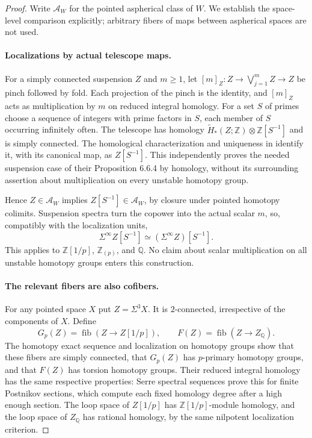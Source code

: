 \begin{proof}
Write $\mathcal A_W$ for the pointed aspherical class of $W$.
We establish the space-level comparison explicitly; arbitrary fibers
of maps between aspherical spaces are not used.

\paragraph{Localizations by actual telescope maps.}
For a simply connected suspension $Z$ and $m\geq1$, let
$[m]_Z:Z\to\bigvee_{j=1}^m Z\to Z$ be pinch followed by fold.
Each projection of the pinch is the identity, and $[m]_Z$ acts
as multiplication by $m$ on reduced integral homology.
For a set $S$ of primes choose a sequence of integers with prime
factors in $S$, each member of $S$ occurring infinitely often.
The telescope has homology
$\widetilde H_*(Z;\mathbb Z)\otimes\mathbb Z[S^{-1}]$ and is
simply connected.  The homological characterization and uniqueness
in \citet[Theorems 6.1.1--6.1.2]{A3MayPonto2012} identify it,
with its canonical map, as $Z[S^{-1}]$.
This independently proves the needed suspension case of their
Proposition 6.6.4 by homology, without its surrounding assertion
about multiplication on every unstable homotopy group.

Hence $Z\in\mathcal A_W$ implies
$Z[S^{-1}]\in\mathcal A_W$, by closure under pointed homotopy
colimits.  Suspension spectra turn the copower into the actual
scalar $m$, so, compatibly with the localization units,
\[
 \Sigma^\infty Z[S^{-1}]
       \simeq(\Sigma^\infty Z)[S^{-1}].
 \tag{A34.5.3}
\]
This applies to $\mathbb Z[1/p]$, $\mathbb Z_{(p)}$, and
$\mathbb Q$.  No claim about scalar multiplication on all unstable
homotopy groups enters this construction.

\paragraph{The relevant fibers are also cofibers.}
For any pointed space $X$ put $Z=\Sigma^3X$.  It is
$2$-connected, irrespective of the components of $X$.  Define
\[
 G_p(Z)=\operatorname{fib}(Z\longrightarrow Z[1/p]),\qquad
 F(Z)=\operatorname{fib}(Z\longrightarrow Z_{\mathbb Q}).
\]
The homotopy exact sequence and localization on homotopy groups
show that these fibers are simply connected, that $G_p(Z)$ has
$p$-primary homotopy groups, and that $F(Z)$ has torsion homotopy
groups.  Their reduced integral homology has the same respective
properties: Serre spectral sequences prove this for finite Postnikov
sections, which compute each fixed homology degree after a high
enough section.  The loop space of $Z[1/p]$ has
$\mathbb Z[1/p]$-module homology, and the loop space of
$Z_{\mathbb Q}$ has rational homology, by the same nilpotent
localization criterion.


\end{proof}
